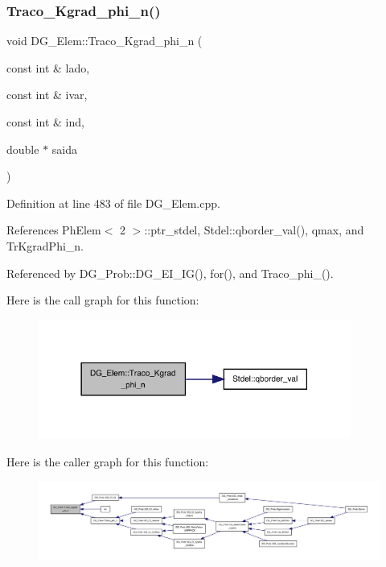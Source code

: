 \subsubsection{\texorpdfstring{Traco\+\_\+\+Kgrad\+\_\+phi\+\_\+n()}{Traco\_Kgrad\_phi\_n()}}
{\footnotesize\ttfamily void D\+G\+\_\+\+Elem\+::\+Traco\+\_\+\+Kgrad\+\_\+phi\+\_\+n (\begin{DoxyParamCaption}\item[{const int \&}]{lado,  }\item[{const int \&}]{ivar,  }\item[{const int \&}]{ind,  }\item[{double $\ast$}]{saida }\end{DoxyParamCaption})}



Definition at line 483 of file D\+G\+\_\+\+Elem.\+cpp.



References Ph\+Elem$<$ 2 $>$\+::ptr\+\_\+stdel, Stdel\+::qborder\+\_\+val(), qmax, and Tr\+Kgrad\+Phi\+\_\+n.



Referenced by D\+G\+\_\+\+Prob\+::\+D\+G\+\_\+\+E\+I\+\_\+\+I\+G(), for(), and Traco\+\_\+phi\+\_().

Here is the call graph for this function\+:
\nopagebreak
\begin{figure}[H]
\begin{center}
\leavevmode
\includegraphics[width=290pt]{classDG__Elem_a0109cc28854e31b5df555513e9fccfed_cgraph}
\end{center}
\end{figure}
Here is the caller graph for this function\+:
\nopagebreak
\begin{figure}[H]
\begin{center}
\leavevmode
\includegraphics[width=350pt]{classDG__Elem_a0109cc28854e31b5df555513e9fccfed_icgraph}
\end{center}
\end{figure}
\mbox{\label{classDG__Elem_ae98efe920078bc5fd18eceee997d44a2}} 
